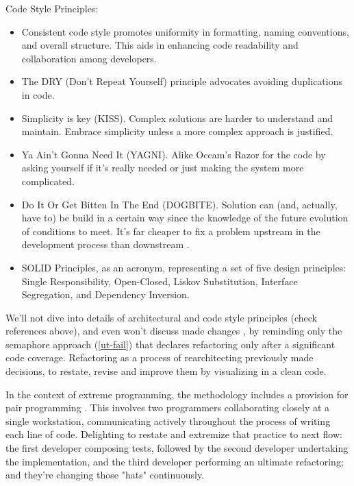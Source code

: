 \noindent Code Style Principles:

\begin{itemize}
  \item Consistent code style \cite{Mart22} promotes uniformity in formatting, naming conventions, and overall structure. 
  This aids in enhancing code readability and collaboration among developers.

  \item The DRY (Don't Repeat Yourself) principle advocates avoiding duplications in code.

  \item Simplicity is key (KISS). Complex solutions are harder to understand and maintain. Embrace simplicity unless a 
  more complex approach is justified.

  \item Ya Ain't Gonna Need It (YAGNI). Alike Occam's Razor for the code by asking yourself if it's really needed or 
  just making the system more complicated.

  \item Do It Or Get Bitten In The End (DOGBITE). Solution can (and, actually, have to) be build in a certain way 
  since the knowledge of the future evolution of conditions to meet. It's far cheaper to fix a problem upstream in the 
  development process than downstream \cite{McCo97}.

  \item SOLID Principles, as an acronym, representing a set of five design principles: Single Responsibility, 
  Open-Closed, Liskov Substitution, Interface Segregation, and Dependency Inversion.
\end{itemize}

\noindent We'll not dive into details of architectural and code style principles (check references above), and even 
won't discuss made changes , by reminding only the semaphore approach (\ref{ut-fail}) that declares 
refactoring only after a significant code coverage. Refactoring as a process of rearchitecting \cite{Chec23} previously
made decisions, to restate, revise and improve them by visualizing in a clean code. 

In the context of extreme programming, the methodology includes a provision for pair programming \cite{Ligu19}. This 
involves two programmers collaborating closely at a single workstation, communicating actively throughout the process 
of writing each line of code. Delighting to restate and extremize that practice to next flow: the first developer 
composing tests, followed by the second developer undertaking the implementation, and the third developer 
performing an ultimate refactoring; and they're changing those "hats" \cite{Bono17} continuously.
